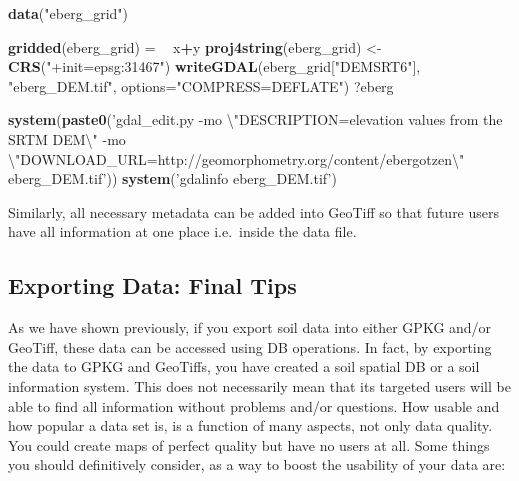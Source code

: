 \documentclass[10pt,b5paper,]{book}
\newenvironment{Shaded}{\begin{snugshade}}{\end{snugshade}}
\newcommand{\CharTok}[1]{\textcolor[rgb]{0.31,0.60,0.02}{#1}}
\newcommand{\DataTypeTok}[1]{\textcolor[rgb]{0.13,0.29,0.53}{#1}}
\newcommand{\ErrorTok}[1]{\textcolor[rgb]{0.64,0.00,0.00}{\textbf{#1}}}
\newcommand{\KeywordTok}[1]{\textcolor[rgb]{0.13,0.29,0.53}{\textbf{#1}}}
\newcommand{\NormalTok}[1]{#1}
\newcommand{\OperatorTok}[1]{\textcolor[rgb]{0.81,0.36,0.00}{\textbf{#1}}}
\newcommand{\StringTok}[1]{\textcolor[rgb]{0.31,0.60,0.02}{#1}}
\theoremstyle{definition}
\theoremstyle{definition}
\theoremstyle{definition}
\theoremstyle{remark}
\begin{document}
\begin{Shaded}
\begin{Highlighting}[]
\KeywordTok{data}\NormalTok{(}\StringTok{"eberg_grid"}\NormalTok{)}

\KeywordTok{gridded}\NormalTok{(eberg_grid) =}\StringTok{ }\ErrorTok{~}\StringTok{ }\NormalTok{x}\OperatorTok{+}\NormalTok{y}
\KeywordTok{proj4string}\NormalTok{(eberg_grid) <-}\StringTok{ }\KeywordTok{CRS}\NormalTok{(}\StringTok{"+init=epsg:31467"}\NormalTok{)}
\KeywordTok{writeGDAL}\NormalTok{(eberg_grid[}\StringTok{"DEMSRT6"}\NormalTok{], }\StringTok{"eberg_DEM.tif"}\NormalTok{, }
            \DataTypeTok{options=}\StringTok{"COMPRESS=DEFLATE"}\NormalTok{)}
\NormalTok{?eberg}

\KeywordTok{system}\NormalTok{(}\KeywordTok{paste0}\NormalTok{(}\StringTok{'gdal_edit.py }
\StringTok{-mo }\CharTok{\textbackslash{}"}\StringTok{DESCRIPTION=elevation values from the SRTM DEM}\CharTok{\textbackslash{}"}\StringTok{ }
\StringTok{-mo }\CharTok{\textbackslash{}"}\StringTok{DOWNLOAD_URL=http://geomorphometry.org/content/ebergotzen}\CharTok{\textbackslash{}"}
\StringTok{eberg_DEM.tif'}\NormalTok{))}
\KeywordTok{system}\NormalTok{(}\StringTok{'gdalinfo eberg_DEM.tif'}\NormalTok{)}
\end{Highlighting}
\end{Shaded}

Similarly, all necessary metadata can be added into GeoTiff so that
future users have all information at one place i.e.~inside the data
file.

\hypertarget{exporting-data-final-tips}{%
\subsection{Exporting Data: Final
Tips}\label{exporting-data-final-tips}}

As we have shown previously, if you export soil data into either GPKG
and/or GeoTiff, these data can be accessed using DB operations. In fact,
by exporting the data to GPKG and GeoTiffs, you have created a soil
spatial DB or a soil information system. This does not necessarily mean
that its targeted users will be able to find all information without
problems and/or questions. How usable and how popular a data set is, is
a function of many aspects, not only data quality. You could create maps
of perfect quality but have no users at all. Some things you should
definitively consider, as a way to boost the usability of your data are:
\end{document}
